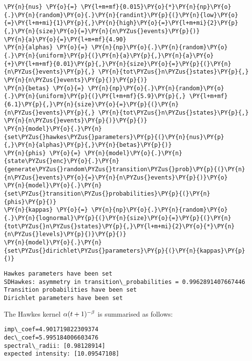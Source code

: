 \documentclass[10pt, article,table]{article}
\begin{document}
\begin{tcolorbox}[breakable, size=fbox, boxrule=1pt, pad at break*=1mm,colback=cellbackground, colframe=cellborder]
\begin{Verbatim}[commandchars=\\\{\}]
\PY{n}{nus} \PY{o}{=} \PY{l+m+mf}{0.015}\PY{o}{*}\PY{n}{np}\PY{o}{.}\PY{n}{random}\PY{o}{.}\PY{n}{randint}\PY{p}{(}\PY{n}{low}\PY{o}{=}\PY{l+m+mi}{1}\PY{p}{,}\PY{n}{high}\PY{o}{=}\PY{l+m+mi}{2}\PY{p}{,}\PY{n}{size}\PY{o}{=}\PY{n}{n\PYZus{}events}\PY{p}{)}
\PY{n}{a}\PY{o}{=}\PY{l+m+mf}{4.90}
\PY{n}{alphas} \PY{o}{=} \PY{n}{np}\PY{o}{.}\PY{n}{random}\PY{o}{.}\PY{n}{uniform}\PY{p}{(}\PY{n}{a}\PY{p}{,}\PY{n}{a}\PY{o}{+}\PY{l+m+mf}{0.01}\PY{p}{,}\PY{n}{size}\PY{o}{=}\PY{p}{(}\PY{n}{n\PYZus{}events}\PY{p}{,} \PY{n}{tot\PYZus{}n\PYZus{}states}\PY{p}{,} \PY{n}{n\PYZus{}events}\PY{p}{)}\PY{p}{)}
\PY{n}{betas} \PY{o}{=} \PY{n}{np}\PY{o}{.}\PY{n}{random}\PY{o}{.}\PY{n}{uniform}\PY{p}{(}\PY{l+m+mf}{5.9}\PY{p}{,} \PY{l+m+mf}{6.1}\PY{p}{,}\PY{n}{size}\PY{o}{=}\PY{p}{(}\PY{n}{n\PYZus{}events}\PY{p}{,} \PY{n}{tot\PYZus{}n\PYZus{}states}\PY{p}{,} \PY{n}{n\PYZus{}events}\PY{p}{)}\PY{p}{)}
\PY{n}{model}\PY{o}{.}\PY{n}{set\PYZus{}hawkes\PYZus{}parameters}\PY{p}{(}\PY{n}{nus}\PY{p}{,}\PY{n}{alphas}\PY{p}{,}\PY{n}{betas}\PY{p}{)}
\PY{n}{phis} \PY{o}{=} \PY{n}{model}\PY{o}{.}\PY{n}{state\PYZus{}enc}\PY{o}{.}\PY{n}{generate\PYZus{}random\PYZus{}transition\PYZus{}prob}\PY{p}{(}\PY{n}{n\PYZus{}events}\PY{o}{=}\PY{n}{n\PYZus{}events}\PY{p}{)}\PY{o}
\PY{n}{model}\PY{o}{.}\PY{n}{set\PYZus{}transition\PYZus{}probabilities}\PY{p}{(}\PY{n}{phis}\PY{p}{)}
\PY{n}{kappas} \PY{o}{=} \PY{n}{np}\PY{o}{.}\PY{n}{random}\PY{o}{.}\PY{n}{lognormal}\PY{p}{(}\PY{n}{size}\PY{o}{=}\PY{p}{(}\PY{n}{tot\PYZus{}n\PYZus{}states}\PY{p}{,}\PY{l+m+mi}{2}\PY{o}{*}\PY{n}{n\PYZus{}levels}\PY{p}{)}\PY{p}{)}
\PY{n}{model}\PY{o}{.}\PY{n}{set\PYZus{}dirichlet\PYZus{}parameters}\PY{p}{(}\PY{n}{kappas}\PY{p}{)}
\end{Verbatim}
\end{tcolorbox}

    \begin{Verbatim}[commandchars=\\\{\}]
Hawkes parameters have been set
SDHawkes: asymmetry in transition\_probabilities = 0.9962891407667446
Transition probabilities have been set
Dirichlet parameters have been set
    \end{Verbatim}
    
The Hawkes kernel $\alpha (t+1)^{-\beta}$ is summarised as follows:     
   \begin{Verbatim}[commandchars=\\\{\}]
imp\_coef=4.901719822309374
dec\_coef=5.995184006603476
spectral\_radii: [0.98128914]
expected intensity: [10.09547108]
    \end{Verbatim}
\end{document}

